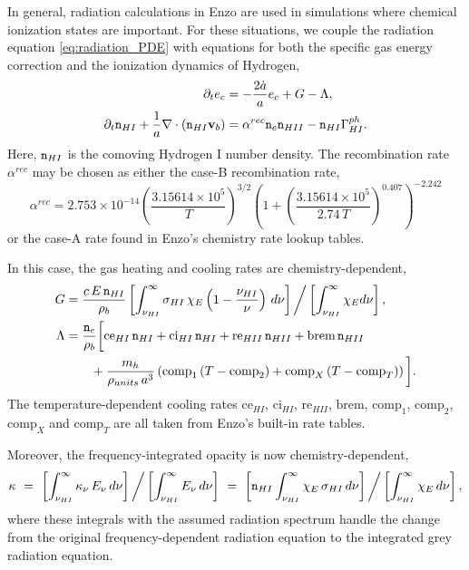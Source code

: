 \documentclass[letterpaper,10pt]{article}
\renewcommand{\(}{\left(}
\renewcommand{\)}{\right)}
\newcommand{\vb}{{\bf v}_b}
\newcommand{\rhob}{\rho_b}
\newcommand{\mn}{{\tt n}}
\begin{document}
In general, radiation calculations in Enzo are used in simulations
where chemical ionization states are important.  For these situations, 
we couple the radiation equation \eqref{eq:radiation_PDE} with
equations for both the specific gas energy correction and the
ionization dynamics of Hydrogen,
\begin{align}
  \notag
  \partial_t e_c &= -\frac{2\dot{a}}{a}e_c + G - \Lambda, \\
  \label{eq:hydrogen_ionization}
  \partial_t \mn_{HI} + \frac{1}{a}\nabla\cdot\(\mn_{HI}\vb\) &=
    \alpha^{rec} \mn_e \mn_{HII} - \mn_{HI} \Gamma_{HI}^{ph}. 
\end{align}
Here, $\mn_{HI}$ is the comoving Hydrogen I number density.  The
recombination rate $\alpha^{rec}$ may be chosen as either the case-B
recombination rate, 
\begin{equation}
\label{eq:alphaB}
\alpha^{rec} = 2.753\times 10^{-14} \left(\frac{3.15614\times 10^5}{T}\right)^{3/2} 
                   \left(1+\left(\frac{3.15614\times 10^5}{2.74\, T}\right)^{0.407}\right)^{-2.242} 
\end{equation}
or the case-A rate found in Enzo's chemistry rate lookup tables.

In this case, the gas heating and cooling rates are
chemistry-dependent, 
\begin{align}
  \label{eq:G_nLTE}
  G &= \frac{c\,E\,\mn_{HI}}{\rhob} 
    \left[\int_{\nu_{HI}}^{\infty} \sigma_{HI}\, \chi_E
    \left(1-\frac{\nu_{HI}}{\nu}\right)\, d\nu\right] \bigg/
    \left[\int_{\nu_{HI}}^{\infty} \chi_E d\nu\right], \\
\label{eq:Lambda_nLTE}
  \Lambda &= \frac{\mn_e}{\rhob}\bigg[\text{ce}_{HI}\, \mn_{HI} 
  + \text{ci}_{HI}\, \mn_{HI} + \text{re}_{HII}\, \mn_{HII} + \text{brem}\,
  \mn_{HII} \\
  \notag &\qquad+ \frac{m_h}{\rho_{units}\, a^3} \left(\text{comp}_1\, (T-\text{comp}_2) 
    + \text{comp}_{X}\, (T-\text{comp}_{T})\right) \bigg].
\end{align}
The temperature-dependent cooling rates
$\text{ce}_{HI}$, $\text{ci}_{HI}$, $\text{re}_{HII}$, $\text{brem}$,
$\text{comp}_1$, $\text{comp}_2$, $\text{comp}_{X}$ and
$\text{comp}_{T}$ are all taken from Enzo's built-in rate tables.

Moreover, the frequency-integrated opacity is now chemistry-dependent,
\begin{equation}
\label{eq:opacityHI}
  \kappa \ = \ 
  \left[\int_{\nu_{HI}}^{\infty} \kappa_{\nu}\,E_{\nu}\,d\nu\right] \bigg/
  \left[\int_{\nu_{HI}}^{\infty} E_{\nu}\,d\nu\right] \ = \ 
  \left[\mn_{HI} \int_{\nu_{HI}}^{\infty}
    \chi_E\,\sigma_{HI}\,d\nu\right] \bigg/
  \left[\int_{\nu_{HI}}^{\infty} \chi_E\,d\nu\right],
\end{equation}
where these integrals with the assumed radiation spectrum handle the
change from the original frequency-dependent radiation equation to the
integrated grey radiation equation.
\end{document}
